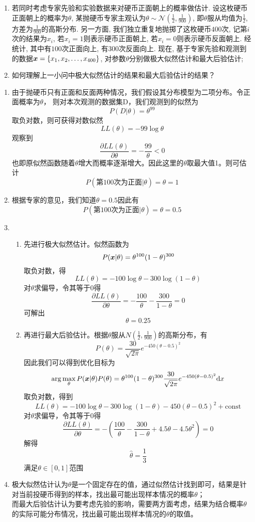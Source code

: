 \documentclass[answers]{exam}  %
\begin{document}
\begin{questions}
\begin{enumerate}
	\item 若同时考虑专家先验和实验数据来对硬币正面朝上的概率做估计. 设这枚硬币正面朝上的概率为$\theta$, 某抛硬币专家主观认为$\theta\sim\mathcal{N}(\frac{1}{2}, \frac{1}{900})$, 即$\theta$服从均值为$\frac{1}{2}$, 方差为$\frac{1}{900}$的高斯分布. 另一方面, 我们独立重复地抛掷了这枚硬币$400$次, 记第$i$次的结果为$x_i$, 若$x_i=1$则表示硬币正面朝上, 若$x_i=0$则表示硬币反面朝上. 经统计, 其中有$100$次正面向上, 有$300$次反面向上. 现在, 基于专家先验和观测到的数据${\boldsymbol{x}}=\{x_1, x_2, \ldots, x_{400}\}$, 对参数$\theta$分别做极大似然估计和最大后验估计;
    
    \item 如何理解上一小问中极大似然估计的结果和最大后验估计的结果？
\end{enumerate}

\begin{solution}
	\begin{enumerate}
		\item 由于抛硬币只有正面和反面两种情况，我们假设其分布模型为二项分布。令正面概率为$\theta$，
		则对本次观测的数据集D，我们观测到的似然为
		\[P(D|\theta)=\theta^{99} \]
		取负对数，则可获得对数似然
		\[LL(\theta)=-99\log \theta \]
		观察到
		\[\frac{\partial LL(\theta)}{\partial \theta}=-\frac{99}{\theta}<0 \]
		也即原似然函数随着$\theta$增大而概率逐渐增大。因此这里的$\theta$取最大值1。则可估计
		\[P(\text{第100次为正面}|\theta)=\theta=1\]
		\item 根据专家的意见，我们知道$\theta=0.5$因此有
		\[P(\text{第100次为正面}|\theta)=\theta=0.5\]
		\item \begin{enumerate}
			\item 先进行极大似然估计。似然函数为
			\[P({\boldsymbol{x}}|\theta)=\theta^{100}(1-\theta)^{300} \]
			取负对数，得
			\[LL(\theta)=-100\log\theta-300\log(1-\theta) \]
			对$\theta$求偏导，令其等于0得
			\[\frac{\partial LL(\theta)}{\partial\theta}=-\frac{100}{\theta}-\frac{300}{1-\theta}=0 \]
			可解出
			\[\theta=0.25\]
			\item 再进行最大后验估计。根据$\theta$服从$N(\frac12,\frac1{900})$的高斯分布，有
			\[P(\theta)=\frac{30}{\sqrt{2\pi}}e^{-450(\theta-0.5)^2} \]
			因此我们可以得到优化目标为
			\[\arg\max_{\theta} P({\boldsymbol{x}}|\theta)P(\theta)=\theta^{100}(1-\theta)^{300}\frac{30}{\sqrt{2\pi}}e^{-450(\theta-0.5)^2}\text{d}x \]
			取负对数，得到
			\[LL(\theta)=-100\log\theta-300\log(1-\theta) - 450(\theta-0.5)^2 + \text{const}\]
			对$\theta$求偏导，令其等于0得
			\[\frac{\partial LL(\theta)}{\partial\theta}=-(\frac{100}{\theta}-\frac{300}{1-\theta}+4.5\theta-4.5\theta^2) =0 \]
			解得\[\hat\theta=\frac13\]满足$\theta\in[0,1]$范围
		\end{enumerate}
		\item 极大似然估计认为$\theta$是一个固定存在的值，通过似然估计找到即可，结果是针对当前投硬币得到的样本，找出最可能出现样本情况的概率$\theta$；\\
		而最大后验估计认为要考虑先验的影响，需要两方面考虑，结果为结合概率$\theta$的实际可能分布情况，找出最可能出现样本情况的$\theta$的取值。			
	\end{enumerate}
\end{solution}



\end{questions}
\end{document}
